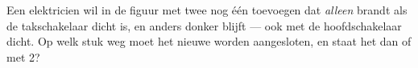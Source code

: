 \begin{exercise}[$\star\star$]\label{exo:g5:series-parallel-circuits:11}
Een elektricien wil in de figuur met twee  nog één
 toevoegen dat \emph{alleen} brandt als de takschakelaar
dicht is, en anders donker blijft --- ook met de hoofdschakelaar
dicht. Op welk stuk weg moet het nieuwe  worden aangesloten, en
staat het dan  of  met  2?
\end{exercise}
